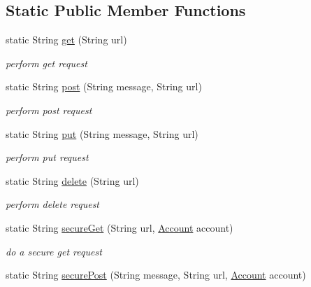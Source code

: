 \subsection*{Static Public Member Functions}
\begin{DoxyCompactItemize}
\item 
static String \hyperlink{classuk_1_1ac_1_1swan_1_1digitaltrails_1_1utils_1_1_h_t_t_p_ae693a8b73812be4b9923a973cb5fb50e}{get} (String url)
\begin{DoxyCompactList}\small\item\em perform get request \end{DoxyCompactList}\item 
static String \hyperlink{classuk_1_1ac_1_1swan_1_1digitaltrails_1_1utils_1_1_h_t_t_p_a71175ca2eeb807eace9fb9b3ad904278}{post} (String message, String url)
\begin{DoxyCompactList}\small\item\em perform post request \end{DoxyCompactList}\item 
static String \hyperlink{classuk_1_1ac_1_1swan_1_1digitaltrails_1_1utils_1_1_h_t_t_p_aaa96becb8f0232d1df98de034d52aeff}{put} (String message, String url)
\begin{DoxyCompactList}\small\item\em perform put request \end{DoxyCompactList}\item 
static String \hyperlink{classuk_1_1ac_1_1swan_1_1digitaltrails_1_1utils_1_1_h_t_t_p_a6f6bf994fc898d4752b546e4100bc24a}{delete} (String url)
\begin{DoxyCompactList}\small\item\em perform delete request \end{DoxyCompactList}\item 
static String \hyperlink{classuk_1_1ac_1_1swan_1_1digitaltrails_1_1utils_1_1_h_t_t_p_af34648645c598fe67da4a775d9d3f047}{secure\+Get} (String url, \hyperlink{classuk_1_1ac_1_1swan_1_1digitaltrails_1_1components_1_1_account}{Account} account)
\begin{DoxyCompactList}\small\item\em do a secure get request \end{DoxyCompactList}\item 
static String \hyperlink{classuk_1_1ac_1_1swan_1_1digitaltrails_1_1utils_1_1_h_t_t_p_a58d1d0b2d8abbba124b2265349051e9a}{secure\+Post} (String message, String url, \hyperlink{classuk_1_1ac_1_1swan_1_1digitaltrails_1_1components_1_1_account}{Account} account)

\end{DoxyCompactItemize}
